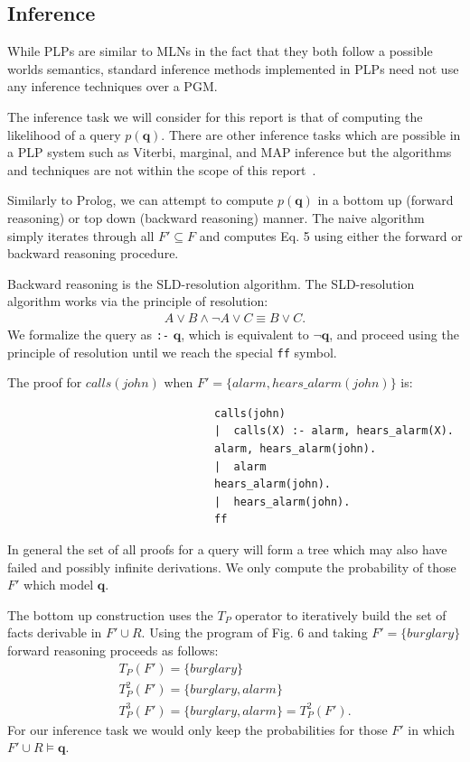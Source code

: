 \documentclass[11pt]{article}
\begin{document}
\subsection{Inference}
While PLPs are similar to MLNs in the fact that they both follow a possible worlds semantics, standard inference methods implemented in PLPs need not use any inference techniques over a PGM.

The inference task we will consider for this report is that of computing the likelihood of a query $p(\mathbf{q})$.  There are other inference tasks which are possible in a PLP system such as Viterbi, marginal, and MAP inference but the algorithms and techniques are not within the scope of this report~\cite{DeRaedt:2015:PPC:2812521.2812529}.

Similarly to Prolog, we can attempt to compute $p(\mathbf{q})$ in a bottom up (forward reasoning) or top down (backward reasoning) manner.  The naive algorithm simply iterates through all $F' \subseteq F$ and computes Eq. 5 using either the forward or backward reasoning procedure.

Backward reasoning is the SLD-resolution algorithm.  The SLD-resolution algorithm works via the principle of resolution:
\begin{gather*}
A \lor B \land \neg A \lor C \equiv B \lor C.
\end{gather*}  
We formalize the query as \verb!:-! $\mathbf{q}$, which is equivalent to $\neg \mathbf{q}$, and proceed using the principle of resolution until we reach the special \verb!ff! symbol.

The proof for $calls(john)$ when $F' = \{alarm, hears\_alarm(john) \}$ is:
\begin{verbatim}
                                calls(john)
                                |  calls(X) :- alarm, hears_alarm(X).
                                alarm, hears_alarm(john).
                                |  alarm
                                hears_alarm(john).
                                |  hears_alarm(john).
                                ff
\end{verbatim}
In general the set of all proofs for a query will form a tree which may also have failed and possibly infinite derivations.  We only compute the probability of those $F'$ which model $\mathbf{q}$.

The bottom up construction uses the $T_P$ operator to iteratively build the set of facts derivable in $F' \cup R$.  Using the program of Fig. 6 and taking $F' = \{ burglary \}$ forward reasoning proceeds as follows:
\begin{gather*}
T_P(F') = \{ burglary \} \\
T_P^2(F') = \{ burglary, alarm \} \\
T_P^3(F') = \{ burglary, alarm \} = T_P^2(F').
\end{gather*}
For our inference task we would only keep the probabilities for those $F'$ in which $F' \cup R \models \mathbf{q}$.
\end{document}
